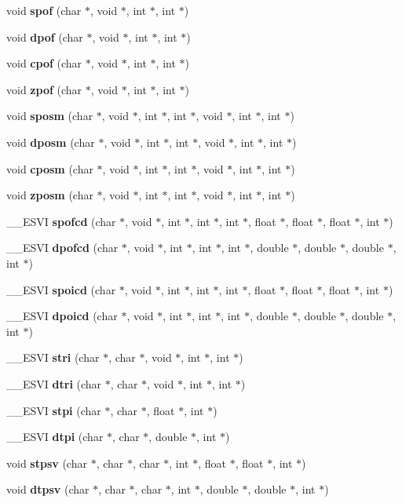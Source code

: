 \begin{CompactItemize}
\item 
void {\bf spof} (char $\ast$, void $\ast$, int $\ast$, int $\ast$)
\item 
void {\bf dpof} (char $\ast$, void $\ast$, int $\ast$, int $\ast$)
\item 
void {\bf cpof} (char $\ast$, void $\ast$, int $\ast$, int $\ast$)
\item 
void {\bf zpof} (char $\ast$, void $\ast$, int $\ast$, int $\ast$)
\item 
void {\bf sposm} (char $\ast$, void $\ast$, int $\ast$, int $\ast$, void $\ast$, int $\ast$, int $\ast$)
\item 
void {\bf dposm} (char $\ast$, void $\ast$, int $\ast$, int $\ast$, void $\ast$, int $\ast$, int $\ast$)
\item 
void {\bf cposm} (char $\ast$, void $\ast$, int $\ast$, int $\ast$, void $\ast$, int $\ast$, int $\ast$)
\item 
void {\bf zposm} (char $\ast$, void $\ast$, int $\ast$, int $\ast$, void $\ast$, int $\ast$, int $\ast$)
\item 
\_\-\_\-ESVI {\bf spofcd} (char $\ast$, void $\ast$, int $\ast$, int $\ast$, int $\ast$, float $\ast$, float $\ast$, float $\ast$, int $\ast$)
\item 
\_\-\_\-ESVI {\bf dpofcd} (char $\ast$, void $\ast$, int $\ast$, int $\ast$, int $\ast$, double $\ast$, double $\ast$, double $\ast$, int $\ast$)
\item 
\_\-\_\-ESVI {\bf spoicd} (char $\ast$, void $\ast$, int $\ast$, int $\ast$, int $\ast$, float $\ast$, float $\ast$, float $\ast$, int $\ast$)
\item 
\_\-\_\-ESVI {\bf dpoicd} (char $\ast$, void $\ast$, int $\ast$, int $\ast$, int $\ast$, double $\ast$, double $\ast$, double $\ast$, int $\ast$)
\item 
\_\-\_\-ESVI {\bf stri} (char $\ast$, char $\ast$, void $\ast$, int $\ast$, int $\ast$)
\item 
\_\-\_\-ESVI {\bf dtri} (char $\ast$, char $\ast$, void $\ast$, int $\ast$, int $\ast$)
\item 
\_\-\_\-ESVI {\bf stpi} (char $\ast$, char $\ast$, float $\ast$, int $\ast$)
\item 
\_\-\_\-ESVI {\bf dtpi} (char $\ast$, char $\ast$, double $\ast$, int $\ast$)
\item 
void {\bf stpsv} (char $\ast$, char $\ast$, char $\ast$, int $\ast$, float $\ast$, float $\ast$, int $\ast$)
\item 
void {\bf dtpsv} (char $\ast$, char $\ast$, char $\ast$, int $\ast$, double $\ast$, double $\ast$, int $\ast$)

\end{CompactItemize}
